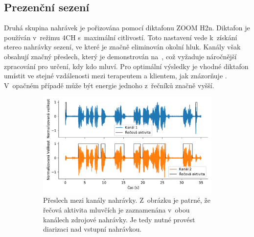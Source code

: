 \subsection{Prezenční sezení}
\label{subsection:Data_offline}
Druhá skupina nahrávek je pořizována pomocí diktafonu ZOOM H2n. Diktafon je používán v~režimu 4CH s~maximální citlivostí. Toto nastavení vede k~získání stereo nahrávky sezení, ve které je značně eliminován okolní hluk. Kanály však obsahují značný přeslech, který je demonstrován na~, což vyžaduje náročnější zpracování pro určení, kdy kdo mluví. Pro optimální výsledky je vhodné diktafon umístit ve stejné vzdálenosti mezi terapeutem a klientem, jak znázorňuje . V~opačném případě může být energie jednoho z~řečníků značně vyšší.


\begin{figure}[ht]
\begin{subfigure}{0.65\textwidth}\centering
    \includegraphics[width=\linewidth]{obrazky-figures/cross_talk.pdf}
    \caption{Přeslech mezi kanály nahrávky. Z~obrázku je patrné, že řečová aktivita mluvčích je zaznamenána v~obou kanálech zdrojové nahrávky. Je tedy nutné provést diarizaci nad vstupní nahrávkou.} \label{fig:Cross-talk}
  \end{subfigure}%
    \hspace*{\fill}
  \begin{subfigure}{0.3\textwidth}

\end{subfigure}
\end{figure}
